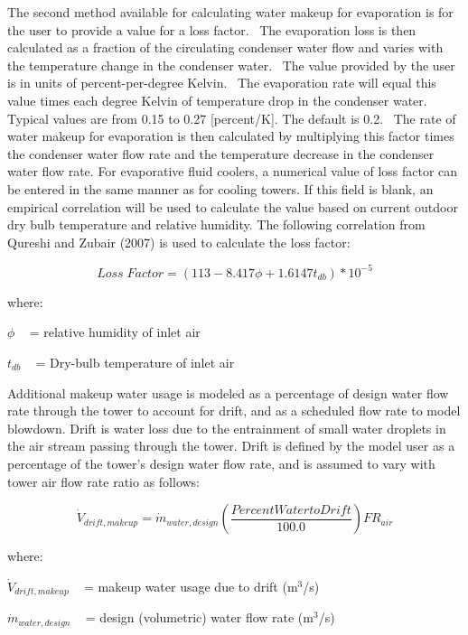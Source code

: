 The second method available for calculating water makeup for evaporation is for the user to provide a value for a loss factor.~ The evaporation loss is then calculated as a fraction of the circulating condenser water flow and varies with the temperature change in the condenser water.~ The value provided by the user is in units of percent-per-degree Kelvin.~ The evaporation rate will equal this value times each degree Kelvin of temperature drop in the condenser water.~ Typical values are from 0.15 to 0.27 {[}percent/K{]}. The default is 0.2.~ The rate of water makeup for evaporation is then calculated by multiplying this factor times the condenser water flow rate and the temperature decrease in the condenser water flow rate. For evaporative fluid coolers, a numerical value of loss factor can be entered in the same manner as for cooling towers. If this field is blank, an empirical correlation will be used to calculate the value based on current outdoor dry bulb temperature and relative humidity. The following correlation from Qureshi and Zubair (2007) is used to calculate the loss factor:

\begin{equation}
Loss\;Factor = (113 - 8.417\phi  + 1.6147{t_{db}})*{10^{ - 5}}
\end{equation}

where:

\(\phi\) ~ = relative humidity of inlet air

\({t_{db}}\) ~ = Dry-bulb temperature of inlet air

Additional makeup water usage is modeled as a percentage of design water flow rate through the tower to account for drift, and as a scheduled flow rate to model blowdown. Drift is water loss due to the entrainment of small water droplets in the air stream passing through the tower. Drift is defined by the model user as a percentage of the tower's design water flow rate, and is assumed to vary with tower air flow rate ratio as follows:

\begin{equation}
{\dot V_{drift,makeup}} = {\dot m_{water,design}}\left( {\frac{{PercentWatertoDrift}}{{100.0}}} \right)F{R_{air}}
\end{equation}

where:

\({\dot V_{drift,makeup}}\) ~ = makeup water usage due to drift (m\(^{3}\)/s)

\({\dot m_{water,design}}\) ~ = design (volumetric) water flow rate (m\(^{3}\)/s)


